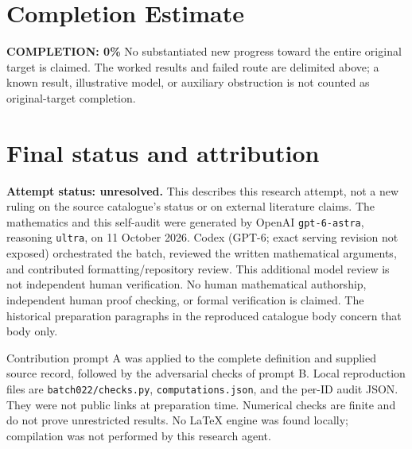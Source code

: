 \documentclass[11pt]{article}
\begin{document}
\section{Completion Estimate}
\noindent\textbf{COMPLETION: 0\%}
No substantiated new progress toward the entire original target is claimed. The worked results and failed route are delimited above; a known result, illustrative model, or auxiliary obstruction is not counted as original-target completion.

\section{Final status and attribution}
\textbf{Attempt status: unresolved.} This describes this research attempt, not a new ruling on the source catalogue's status or on external literature claims.
The mathematics and this self-audit were generated by OpenAI \texttt{gpt-6-astra}, reasoning \texttt{ultra}, on 11 October 2026. Codex (GPT-6; exact serving revision not exposed) orchestrated the batch, reviewed the written mathematical arguments, and contributed formatting/repository review. This additional model review is not independent human verification. No human mathematical authorship, independent human proof checking, or formal verification is claimed. The historical preparation paragraphs in the reproduced catalogue body concern that body only.

Contribution prompt A was applied to the complete definition and supplied source record, followed by the adversarial checks of prompt B. Local reproduction files are \texttt{batch022/checks.py}, \texttt{computations.json}, and the per-ID audit JSON. They were not public links at preparation time. Numerical checks are finite and do not prove unrestricted results. No LaTeX engine was found locally; compilation was not performed by this research agent.
\end{document}
